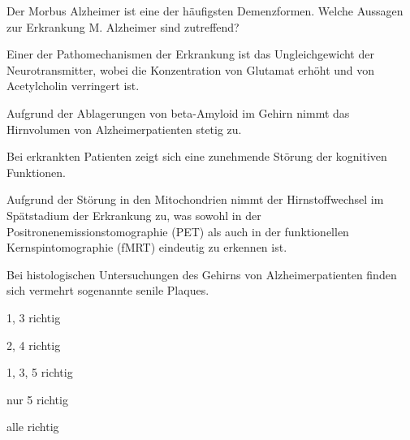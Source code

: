Der Morbus Alzheimer ist eine der häufigsten Demenzformen. Welche Aussagen zur Erkrankung M. Alzheimer sind zutreffend?

\begin{minipage}{.7\linewidth}
  \begin{benumerate}
    \item Einer der Pathomechanismen der Erkrankung ist das Ungleichgewicht der Neurotransmitter, wobei die Konzentration von Glutamat erhöht und von Acetylcholin verringert ist.
    \item Aufgrund der Ablagerungen von beta-Amyloid im Gehirn nimmt das Hirnvolumen von Alzheimerpatienten stetig zu.
    \item Bei erkrankten Patienten zeigt sich eine zunehmende Störung der kognitiven Funktionen.
    \item Aufgrund der Störung in den Mitochondrien nimmt der Hirnstoffwechsel im Spätstadium der Erkrankung zu, was sowohl in der Positronenemissionstomographie (PET) als auch in der funktionellen Kernspintomographie (fMRT) eindeutig zu erkennen ist.
    \item Bei histologischen Untersuchungen des Gehirns von Alzheimerpatienten finden sich vermehrt sogenannte senile Plaques.
  \end{benumerate}
\end{minipage}%
\begin{minipage}{.3\linewidth}
  \begin{checklist}[leftmargin=7mm]
    \item 1, 3 richtig
    \item 2, 4 richtig
    \item[\checkedbox] 1, 3, 5 richtig
    \item nur 5 richtig
    \item alle richtig
  \end{checklist}
\end{minipage}